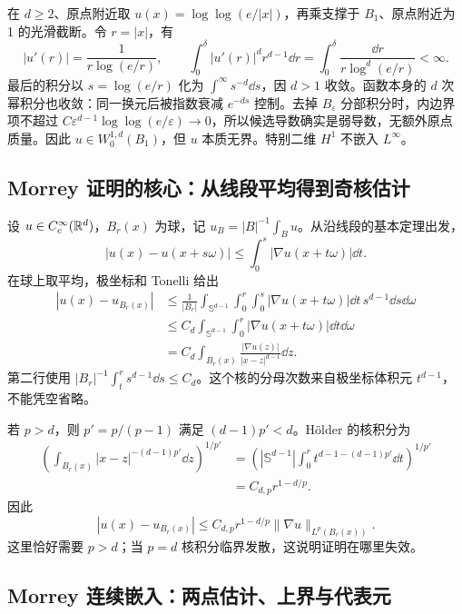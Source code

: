 \begin{example}[临界无界函数的完整检查]\label{ex:sobolev-loglog}
在 $d\ge2$、原点附近取 $u(x)=\log\log(e/|x|)$，再乘支撑于 $B_1$、原点附近为 1 的光滑截断。令 $r=|x|$，有
\[
 |u'(r)|=\frac1{r\log(e/r)},\qquad
 \int_0^\delta|u'(r)|^dr^{d-1}\dd r
 =\int_0^\delta\frac{\dd r}{r\log^d(e/r)}<\infty.
\]
最后的积分以 $s=\log(e/r)$ 化为 $\int^\infty s^{-d}\dd s$，因 $d>1$ 收敛。函数本身的 $d$ 次幂积分也收敛：同一换元后被指数衰减 $e^{-ds}$ 控制。去掉 $B_\varepsilon$ 分部积分时，内边界项不超过 $C\varepsilon^{d-1}\log\log(e/\varepsilon)\to0$，所以候选导数确实是弱导数，无额外原点质量。因此 $u\in W^{1,d}_0(B_1)$，但 $u$ 本质无界。特别二维 $H^1$ 不嵌入 $L^\infty$。
\end{example}

\subsection{Morrey 证明的核心：从线段平均得到奇核估计}

设 $u\in C_c^\infty(\mathbb R^d)$，$B_r(x)$ 为球，记 $u_B=|B|^{-1}\int_Bu$。从沿线段的基本定理出发，
\[
 |u(x)-u(x+s\omega)|\le\int_0^s|\nabla u(x+t\omega)|\dd t.
\]
在球上取平均，极坐标和 Tonelli 给出
\begin{align*}
 |u(x)-u_{B_r(x)}|
 &\le\frac1{|B_r|}\int_{\mathbb S^{d-1}}\int_0^r
       \int_0^s|\nabla u(x+t\omega)|\dd t\,s^{d-1}\dd s\dd\omega\\
 &\le C_d\int_{\mathbb S^{d-1}}\int_0^r
                   |\nabla u(x+t\omega)|\dd t\dd\omega\\
 &=C_d\int_{B_r(x)}\frac{|\nabla u(z)|}{|x-z|^{d-1}}\dd z.
\end{align*}
第二行使用 $|B_r|^{-1}\int_t^rs^{d-1}\dd s\le C_d$。这个核的分母次数来自极坐标体积元 $t^{d-1}$，不能凭空省略。

若 $p>d$，则 $p'=p/(p-1)$ 满足 $(d-1)p'<d$。H\"older 的核积分为
\begin{align*}
 \left(\int_{B_r(x)}|x-z|^{-(d-1)p'}\dd z\right)^{1/p'}
 &=\left(|\mathbb S^{d-1}|\int_0^r
                 t^{d-1-(d-1)p'}\dd t\right)^{1/p'}\\
 &=C_{d,p}r^{1-d/p}.
\end{align*}
因此
\begin{equation}
 |u(x)-u_{B_r(x)}|\le C_{d,p}r^{1-d/p}\|\nabla u\|_{L^p(B_r(x))}.
 \label{eq:sobolev-morrey-average}
\end{equation}
这里恰好需要 $p>d$；当 $p=d$ 核积分临界发散，这说明证明在哪里失效。

\subsection{Morrey 连续嵌入：两点估计、上界与代表元}

